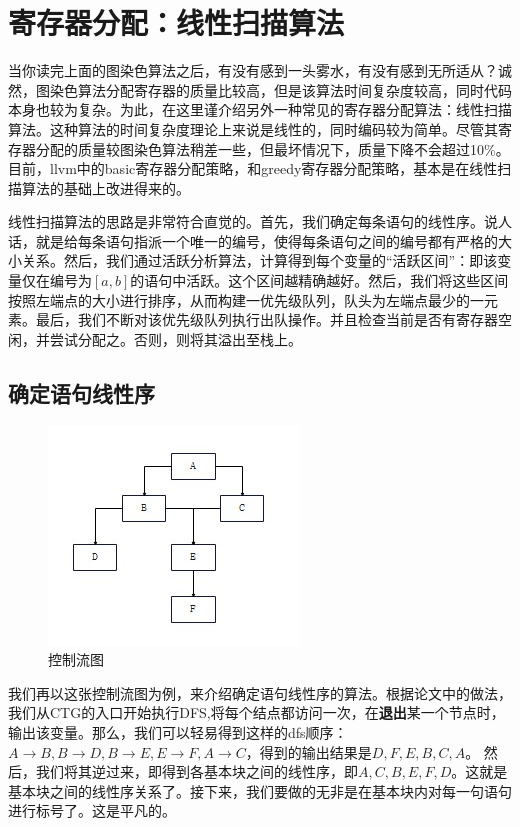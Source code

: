 \section{寄存器分配：线性扫描算法}
当你读完上面的图染色算法之后，有没有感到一头雾水，有没有感到无所适从？诚然，图染色算法分配寄存器的质量比较高，但是该算法时间复杂度较高，同时代码本身也较为复杂。为此，在这里谨介绍另外一种常见的寄存器分配算法：线性扫描算法。这种算法的时间复杂度理论上来说是线性的，同时编码较为简单。尽管其寄存器分配的质量较图染色算法稍差一些，但最坏情况下，质量下降不会超过10\%。目前，llvm中的basic寄存器分配策略，和greedy寄存器分配策略，基本是在线性扫描算法的基础上改进得来的。

线性扫描算法的思路是非常符合直觉的。首先，我们确定每条语句的线性序。说人话，就是给每条语句指派一个唯一的编号，使得每条语句之间的编号都有严格的大小关系。然后，我们通过活跃分析算法，计算得到每个变量的“活跃区间”：即该变量仅在编号为$[a, b]$的语句中活跃。这个区间越精确越好。然后，我们将这些区间按照左端点的大小进行排序，从而构建一优先级队列，队头为左端点最少的一元素。最后，我们不断对该优先级队列执行出队操作。并且检查当前是否有寄存器空闲，并尝试分配之。否则，则将其溢出至栈上。

\subsection{确定语句线性序}
    \begin{figure}[h]
        \centering
        \includegraphics[width=0.5\linewidth]{CTG.jpg}
        \caption{控制流图}
        \label{fig:enter-label}
    \end{figure}
我们再以这张控制流图为例，来介绍确定语句线性序的算法。根据论文中的做法，我们从CTG的入口开始执行DFS,将每个结点都访问一次，在\textbf{退出}某一个节点时，输出该变量。那么，我们可以轻易得到这样的dfs顺序：$A\to B, B\to D, B\to E, E\to F, A\to C$，得到的输出结果是$D, F, E, B, C, A$。
然后，我们将其逆过来，即得到各基本块之间的线性序，即$A, C, B, E, F, D$。这就是基本块之间的线性序关系了。接下来，我们要做的无非是在基本块内对每一句语句进行标号了。这是平凡的。

